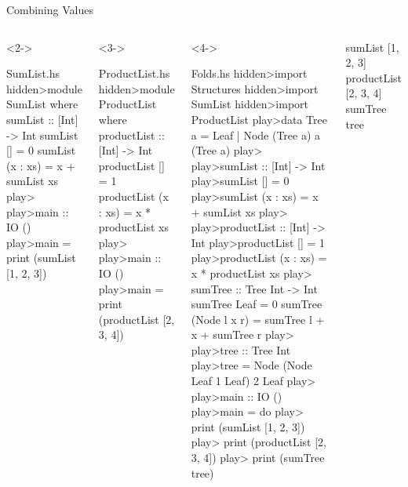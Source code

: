 \begin{frame}[fragile]{Combining Values}
\begin{fullwidth}
\begin{columns}[T,onlytextwidth]
%
\begin{uncoverenv}<2->
\begin{mhsfile}{SumList.hs}
hidden>module SumList where
sumList :: [Int] -> Int
sumList []       = 0
sumList (x : xs) = x + sumList xs
play>
play>main :: IO ()
play>main = print (sumList [1, 2, 3])
\end{mhsfile}
\end{uncoverenv}
\begin{uncoverenv}<3->
\begin{mhsfile}{ProductList.hs}
hidden>module ProductList where
productList :: [Int] -> Int
productList []       = 1
productList (x : xs) = x * productList xs
play>
play>main :: IO ()
play>main = print (productList [2, 3, 4])
\end{mhsfile}
\end{uncoverenv}
\begin{uncoverenv}<4->
\begin{mhsfile}{Folds.hs}
hidden>import Structures
hidden>import SumList
hidden>import ProductList
play>data Tree a = Leaf | Node (Tree a) a (Tree a)
play>
play>sumList :: [Int] -> Int
play>sumList []       = 0
play>sumList (x : xs) = x + sumList xs
play>
play>productList :: [Int] -> Int
play>productList []       = 1
play>productList (x : xs) = x * productList xs
play>
sumTree :: Tree Int -> Int
sumTree Leaf         = 0
sumTree (Node l x r) =
  sumTree l + x + sumTree r
play>
play>tree :: Tree Int
play>tree = Node (Node Leaf 1 Leaf) 2 Leaf
play>
play>main :: IO ()
play>main = do
play>  print (sumList [1, 2, 3])
play>  print (productList [2, 3, 4])
play>  print (sumTree tree)
\end{mhsfile}
\end{uncoverenv}
%
\begin{ghcisession}[start=2]
sumList [1, 2, 3]
productList [2, 3, 4]
sumTree tree
\end{ghcisession}
\vspace{5mm}
\onslide<5->{\centering
   \begin{tikzpicture}[V/.style={font=\footnotesize\ttfamily,inner sep=.6pt,text height=1.6ex,text depth=.4ex},
         O/.style={V,text=CT,font=\footnotesize\ttfamily\bfseries},
         S/.style={-{Kite[length=1.1mm,width=.9mm]},CT!60,line width=.5pt,shorten >=.6pt,shorten <=.6pt},

\end{tikzpicture}}
\end{columns}
\end{fullwidth}
\end{frame}
